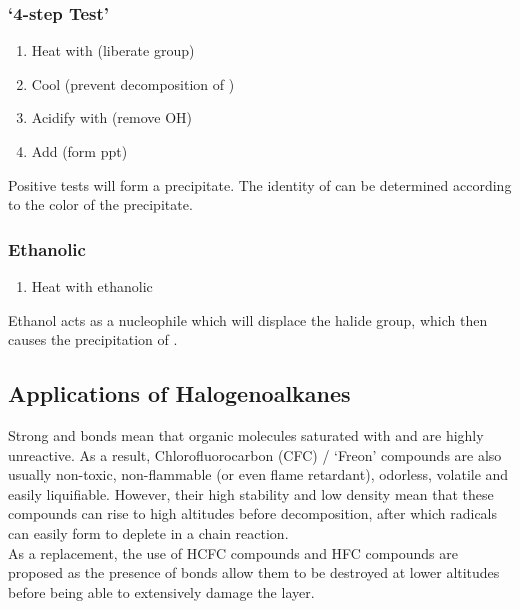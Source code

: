 \documentclass[../main]{subfiles}
\begin{document}
	\subsubsection{`4-step Test'}

	\begin{enumerate}
		\item Heat with  (liberate  group)
		\item Cool (prevent decomposition of )
		\item Acidify with  (remove OH)
		\item Add  (form ppt)
	\end{enumerate}

	Positive tests will form a  precipitate. The identity of  can be determined according to the color of the precipitate. \\

	\subsubsection{Ethanolic }

	\begin{enumerate}
		\item Heat with ethanolic 
	\end{enumerate}

	Ethanol acts as a nucleophile which will displace the halide group, which then causes the precipitation of .

	\subsection{Applications of Halogenoalkanes}

	Strong  and  bonds mean that organic molecules saturated with  and  are highly unreactive. As a result, Chlorofluorocarbon (CFC) / `Freon' compounds are also usually non-toxic, non-flammable (or even flame retardant), odorless, volatile and easily liquifiable. However, their high stability and low density mean that these compounds can rise to high altitudes before decomposition, after which  radicals can easily form to deplete  in a chain reaction. \\

	As a replacement, the use of HCFC compounds and HFC compounds are proposed as the presence of  bonds allow them to be destroyed at lower altitudes before being able to extensively damage the  layer.
	
\end{document}
